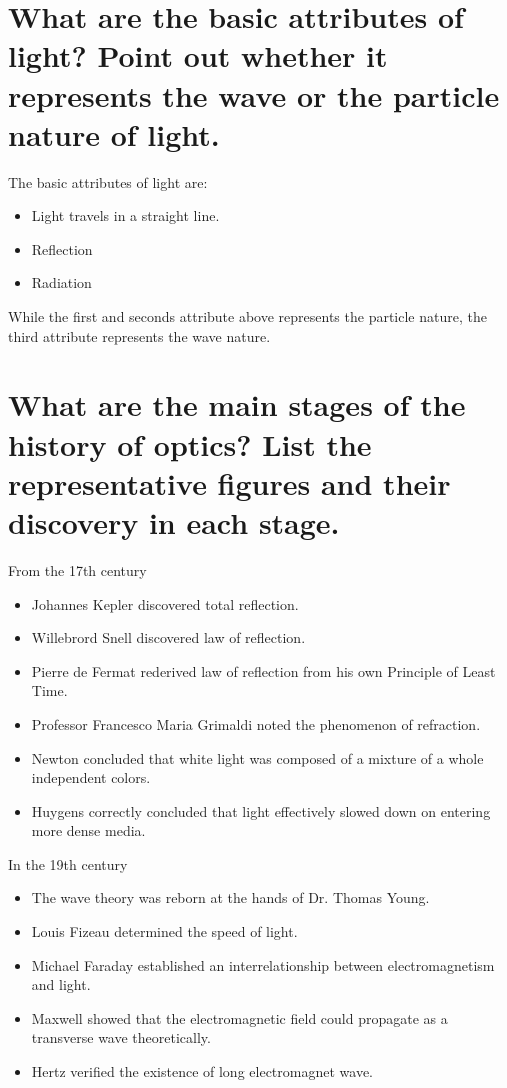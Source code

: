 \documentclass{article}
\begin{document}
\section{What are the basic attributes of light? Point out whether it represents the wave or the particle nature of light.}

The basic attributes of light are:

\begin{itemize}
\item Light travels in a straight line.
\item Reflection
\item Radiation
  
\end{itemize}

While the first and seconds attribute above represents the particle nature, the third attribute represents the wave nature.

\section{What are the main stages of the history of optics? List the representative figures and their discovery in each stage.}

From the 17th century

\begin{itemize}
\item Johannes Kepler discovered total reflection.
\item Willebrord Snell discovered law of reflection.
\item Pierre de Fermat rederived law of reflection from his own Principle of Least Time.
\item Professor Francesco Maria Grimaldi noted the phenomenon of refraction.
\item Newton concluded that white light was composed of a mixture of a whole independent colors.
\item Huygens correctly concluded that light effectively slowed down on entering more dense media.
\end{itemize}

In the 19th century
\begin{itemize}
\item The wave theory was reborn at the hands of Dr. Thomas Young.
\item Louis Fizeau determined the speed of light.
\item Michael Faraday established an interrelationship between electromagnetism and light.
\item Maxwell showed that the electromagnetic field could propagate as a transverse wave theoretically.
\item Hertz verified the existence of long electromagnet wave.
\end{itemize}
\end{document}
